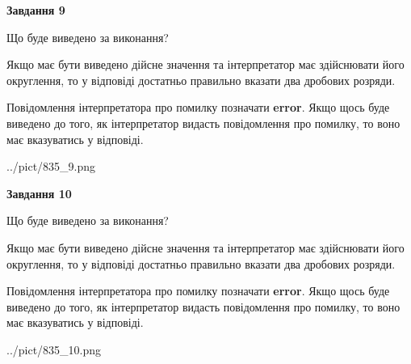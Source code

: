 \documentclass[12pt, ukrainian]{article}
\begin{document}
{\begin {Large}
{\begin {center}\textbf{Завдання 9}\end {center}}\par
Що буде виведено за виконання? \par

Якщо має бути виведено дійсне значення та інтерпретатор має здійснювати його округлення, 
то у відповіді достатньо правильно вказати два дробових розряди.

Повідомлення інтерпретатора про помилку позначати \textbf{error}.
Якщо щось буде виведено до того, як інтерпретатор видасть повідомлення про помилку, 
то воно має вказуватись у відповіді. \par

\begin{center}
	{../pict/835_9.png}
\end{center}
\newpage

{\begin {center}\textbf{Завдання 10}\end {center}}\par
Що буде виведено за виконання? \par

Якщо має бути виведено дійсне значення та інтерпретатор має здійснювати його округлення, 
то у відповіді достатньо правильно вказати два дробових розряди.

Повідомлення інтерпретатора про помилку позначати \textbf{error}.
Якщо щось буде виведено до того, як інтерпретатор видасть повідомлення про помилку, 
то воно має вказуватись у відповіді. \par

\begin{center}
	{../pict/835_10.png}
\end{center}
\newpage

\end {Large}}
\end{document}
